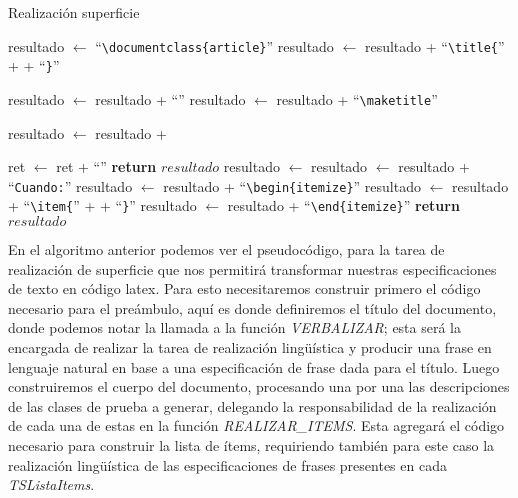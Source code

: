 \begin{algorithm}
  \caption{Realización superficie}\label{alg:realization}
  \begin{algorithmic}[1]
  
  \State resultado $\gets$ ``\verb|\documentclass{article}|''
  \State resultado $\gets$ resultado + ``\verb|\title{|'' +  + ``\verb|}|''
  
  \State resultado $\gets$ resultado + ``\verb||''
  \State resultado $\gets$ resultado + ``\verb|\maketitle|''
  
    \State resultado $\gets$ resultado +   
  \EndFor

  \State ret $\gets$ ret + ``\verb||''
  \State \textbf{return} $resultado$
  \EndFunction
  \Statex
    \State resultado $\gets$  
	\State resultado $\gets$ resultado + ``\verb|Cuando:|''
    \State resultado $\gets$ resultado + ``\verb|\begin{itemize}|''
      \State resultado $\gets$ resultado + ``\verb|\item{|'' +  + ``\verb|}|'' 
    \EndFor  
    \State resultado $\gets$ resultado + ``\verb|\end{itemize}|''
    \State \textbf{return} $resultado$
  \EndFunction
\end{algorithmic}
\end{algorithm}

En el algoritmo anterior podemos ver el pseudocódigo, para la tarea de realización de superficie que nos permitirá transformar nuestras especificaciones de texto en código latex. Para esto necesitaremos construir primero el código necesario para el preámbulo, aquí es donde definiremos el título del documento, donde podemos notar la llamada a la función \emph{VERBALIZAR}; esta será la encargada de realizar la tarea de realización lingüística y producir una frase en lenguaje natural en base a una especificación de frase dada para el título. Luego construiremos el cuerpo del documento, procesando una por una las descripciones de las clases de prueba a generar, delegando la responsabilidad de la realización de cada una de estas en la función \emph{REALIZAR\_ITEMS}. Esta agregará el código necesario para construir la lista de ítems, requiriendo también para este caso la realización lingüística de las especificaciones de frases presentes en cada \emph{TSListaItems}.

